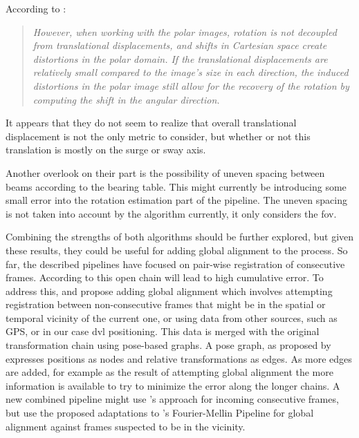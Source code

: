 According to \citeauthor{Hurtos2015}\cite{Hurtos2015}:
\begin{quote}
    \textit{However, when working with the polar images, rotation is not decoupled from translational displacements, and shifts in Cartesian space create distortions in the polar domain. If the translational displacements are relatively small compared to the image’s size in each direction, the induced distortions in the polar image still allow for the recovery of the rotation by computing the shift in the angular direction.}
\end{quote}

It appears that they do not seem to realize that overall translational displacement is not the only metric to consider, but whether or not this translation is mostly on the surge or sway axis.

Another overlook on their part is the possibility of uneven spacing between beams according to the bearing table. This might currently be introducing some small error into the rotation estimation part of the pipeline. The uneven spacing is not taken into account by the algorithm currently, it only considers the \acrshort{fov}. 


Combining the strengths of both algorithms should be further explored, but given these results, they could be useful for adding global alignment to the process. So far, the described pipelines have focused on pair-wise registration of consecutive frames. According to \citeauthor{Hurtos2015}\cite{Hurtos2015} this open chain will lead to high cumulative error. To address this, \citeauthor{Hurtos2015}\cite{Hurtos2015} and \citeauthor{Das2021}\cite{Das2021} propose adding global alignment which involves attempting registration between non-consecutive frames that might be in the spatial or temporal vicinity of the current one, or using data from other sources, such as GPS, or in our case \acrshort{dvl} positioning. This data is merged with the original transformation chain using pose-based graphs. A pose graph, as proposed by \citeauthor{Kummerle2011}\cite{Kummerle2011} expresses positions as nodes and relative transformations as edges. As more edges are added, for example as the result of attempting global alignment the more information is available to try to minimize the error along the longer chains. A new combined pipeline might use \citeauthor{Hurtos2015}'s approach for incoming consecutive frames, but use the proposed adaptations to \citeauthor{Reddy1996}'s Fourier-Mellin Pipeline for global alignment against frames suspected to be in the vicinity.

